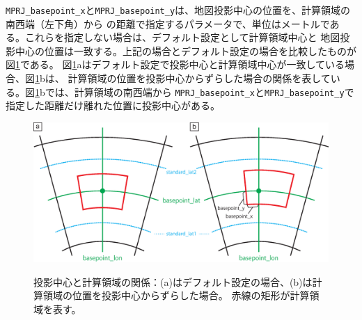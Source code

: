 \noindent \verb|MPRJ_basepoint_x|と\verb|MPRJ_basepoint_y|は、地図投影中心の位置を、計算領域の南西端（左下角）から
の距離で指定するパラメータで、単位はメートルである。これらを指定しない場合は、デフォルト設定として計算領域中心と
地図投影中心の位置は一致する。上記の場合とデフォルト設定の場合を比較したものが図\ref{fig:map_lc}である。
図\ref{fig:map_lc}aはデフォルト設定で投影中心と計算領域中心が一致している場合、図\ref{fig:map_lc}bは、
計算領域の位置を投影中心からずらした場合の関係を表している。図\ref{fig:map_lc}bでは、計算領域の南西端から
\verb|MPRJ_basepoint_x|と\verb|MPRJ_basepoint_y|で指定した距離だけ離れた位置に投影中心がある。

\begin{figure}[t]
\begin{center}
  \includegraphics[width=0.8\hsize]{./figure/LC_latlon_xy.eps}\\
  \caption{投影中心と計算領域の関係：(a)はデフォルト設定の場合、(b)は計算領域の位置を投影中心からずらした場合。
  赤線の矩形が計算領域を表す。}
  \label{fig:map_lc}
\end{center}
\end{figure}

